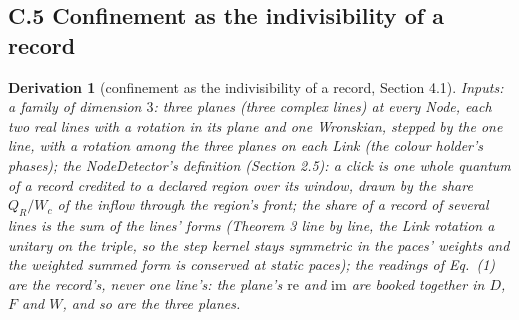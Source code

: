 \documentclass[pdflatex,sn-mathphys-num]{sn-jnl}
\theoremstyle{thmstyleone}
\newtheorem{derivation}{Derivation}
\renewcommand{\thederivation}{S.\arabic{derivation}}
\begin{document}
\subsection*{C.5 Confinement as the indivisibility of a record}

\renewcommand{\thederivation}{C.\arabic{derivation}}\setcounter{derivation}{4}
\begin{derivation}[confinement as the indivisibility of a record, Section 4.1]
\emph{Inputs:} a family of dimension $3$: three planes (three complex lines) at every Node, each two real lines with a rotation in its plane and one Wronskian, stepped by the one line, with a rotation among the three planes on each Link (the colour holder's phases); the NodeDetector's definition (Section 2.5): a click is one whole quantum of a record credited to a declared region over its window, drawn by the share $Q_R / W_c$ of the inflow through the region's front; the share of a record of several lines is the sum of the lines' forms (Theorem 3 line by line, the Link rotation a unitary on the triple, so the step kernel stays symmetric in the paces' weights and the weighted summed form is conserved at static paces); the readings of Eq.~(1) are the record's, never one line's: the plane's $\mathrm{re}$ and $\mathrm{im}$ are booked together in $D$, $F$ and $W$, and so are the three planes.

\end{derivation}
\end{document}
